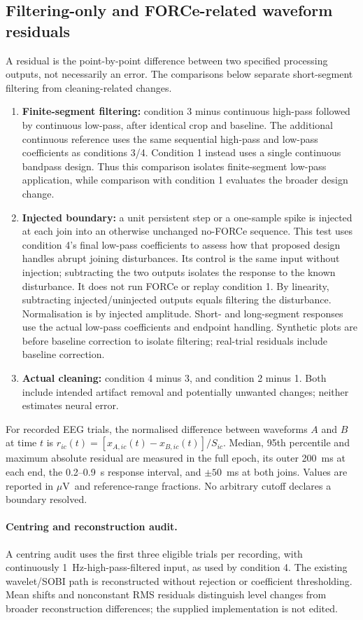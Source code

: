 \documentclass[11pt,a4paper]{article}
\newcommand{\uv}{\ensuremath{\mu\mathrm{V}}}
\begin{document}
\subsection{Filtering-only and FORCe-related waveform residuals}
A residual is the point-by-point difference between two specified processing outputs, not necessarily an error. The comparisons below separate short-segment filtering from cleaning-related changes.
\begin{enumerate}
\item \textbf{Finite-segment filtering:} condition 3 minus continuous high-pass followed by continuous low-pass, after identical crop and baseline. The additional continuous reference uses the same sequential high-pass and low-pass coefficients as conditions 3/4. Condition 1 instead uses a single continuous bandpass design. Thus this comparison isolates finite-segment low-pass application, while comparison with condition 1 evaluates the broader design change.
\item \textbf{Injected boundary:} a unit persistent step or a one-sample spike is injected at each join into an otherwise unchanged no-FORCe sequence. This test uses condition 4's final low-pass coefficients to assess how that proposed design handles abrupt joining disturbances. Its control is the same input without injection; subtracting the two outputs isolates the response to the known disturbance. It does not run FORCe or replay condition 1. By linearity, subtracting injected/uninjected outputs equals filtering the disturbance. Normalisation is by injected amplitude. Short- and long-segment responses use the actual low-pass coefficients and endpoint handling. Synthetic plots are before baseline correction to isolate filtering; real-trial residuals include baseline correction.
\item \textbf{Actual cleaning:} condition 4 minus 3, and condition 2 minus 1. Both include intended artifact removal and potentially unwanted changes; neither estimates neural error.
\end{enumerate}
For recorded EEG trials, the normalised difference between waveforms $A$ and $B$ at time $t$ is $r_{ic}(t)=[x_{A,ic}(t)-x_{B,ic}(t)]/S_{ic}$. Median, 95th percentile and maximum absolute residual are measured in the full epoch, its outer 200~ms at each end, the 0.2--0.9~s response interval, and $\pm50$~ms at both joins. Values are reported in \uv\ and reference-range fractions. No arbitrary cutoff declares a boundary resolved.
\paragraph{Centring and reconstruction audit.} A centring audit uses the first three eligible trials per recording, with continuously 1~Hz-high-pass-filtered input, as used by condition 4. The existing wavelet/SOBI path is reconstructed without rejection or coefficient thresholding. Mean shifts and nonconstant RMS residuals distinguish level changes from broader reconstruction differences; the supplied implementation is not edited.
\end{document}
